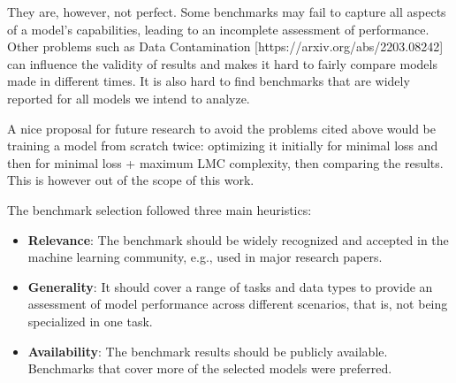         They are, however, not perfect. Some benchmarks may fail to capture all aspects of a model's capabilities, leading to an incomplete assessment of performance. Other problems such as Data Contamination [https://arxiv.org/abs/2203.08242] can influence the validity of results and makes it hard to fairly compare models made in different times. It is also hard to find benchmarks that are widely reported for all models we intend to analyze.

        A nice proposal for future research to avoid the problems cited above would be training a model from scratch twice: optimizing it initially for minimal loss and then for minimal loss + maximum LMC complexity, then comparing the results. This is however out of the scope of this work.

        The benchmark selection followed three main heuristics:
        \begin{itemize}
            \item \textbf{Relevance}: The benchmark should be widely recognized and accepted in the machine learning community, e.g., used in major research papers.
            \item \textbf{Generality}: It should cover a range of tasks and data types to provide an assessment of model performance across different scenarios, that is, not being specialized in one task.
            \item \textbf{Availability}: The benchmark results should be publicly available. Benchmarks that cover more of the selected models were preferred.
        \end{itemize}

